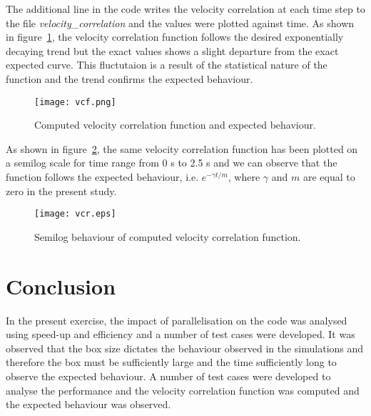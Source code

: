 \documentclass[11pt, oneside]{article}
\begin{document}
The additional line in the code writes the velocity correlation at each time step to the file \textit{velocity\_correlation} and the values were plotted against time. As shown in figure~\ref{fig:vcf}, the velocity correlation function follows the desired exponentially decaying trend but the exact values shows a slight departure from the exact expected curve. This fluctutaion is a result of the statistical nature of the function and the trend confirms the expected behaviour. 
	\begin{figure}[h]
		\centering
		\texttt{[image: vcf.png]}
		\caption{Computed velocity correlation function and expected behaviour.}
		\label{fig:vcf}
	\end{figure} 
        As shown in figure~\ref{fig:vcr}, the same velocity correlation function has been plotted on a semilog scale for time range from \num{0} \si{\second} to  \num{2.5} \si{\second} and we can observe that the function follows the expected behaviour, i.e. \(e^{-\gamma t/m}\), where \(\gamma\) and \(m\) are equal to zero in the present study.
        \begin{figure}[h]
		\centering
		\texttt{[image: vcr.eps]}
		\caption{Semilog behaviour of computed velocity correlation function.}
		\label{fig:vcr}
	\end{figure}

\section{Conclusion}
In the present exercise, the impact of parallelisation on the code was analysed using speed-up and efficiency and a number of test cases were developed. It was observed that the box size dictates the behaviour observed in the simulations and therefore the box must be sufficiently large and the time sufficiently long to observe the expected behaviour. A number of test cases were developed to analyse the performance and the velocity correlation function was computed and the expected behaviour was observed.                  



\end{document}
